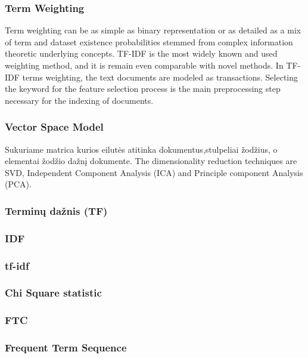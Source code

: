 \documentclass{VUMIFInfKursinis}
\begin{document}
		\subsubsection{Term Weighting}
			Term weighting can be as simple as binary representation or as detailed as a mix of term and dataset existence probabilities stemmed from complex information theoretic underlying concepts. TF-IDF is the most widely known and used weighting method, and it is remain even comparable with novel methods. In TF-IDF terms weighting, the text documents are modeled as transactions.  Selecting the keyword for the feature selection process is the main preprocessing step necessary for the indexing of documents.
		\subsubsection{Vector Space Model}
			Sukuriame matrica kurios eilutės atitinka dokumentus,stulpeliai žodžius, o elementai žodžio dažnį dokumente.
			The dimensionality reduction techniques are SVD, Independent Component Analysis (ICA) and Principle component Analysis (PCA). 

		\subsubsection{Terminų dažnis (TF)}

		\subsubsection{IDF}

		\subsubsection{tf-idf}


		\subsubsection{Chi Square statistic}

		\subsubsection{FTC}

		\subsubsection{Frequent Term Sequence}
\end{document}
